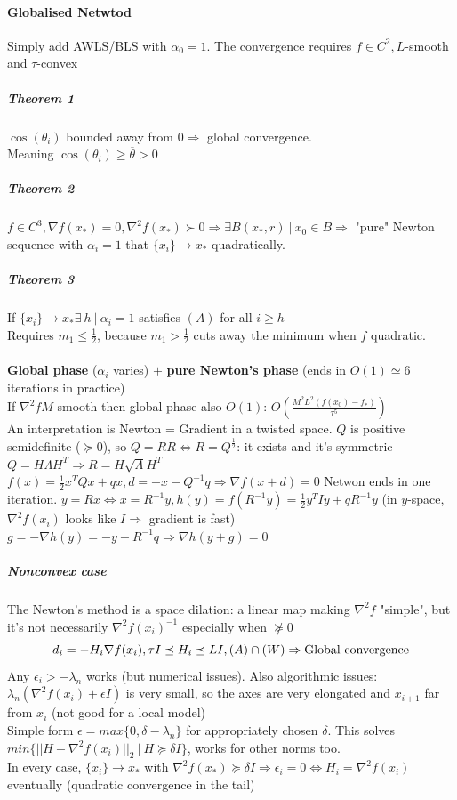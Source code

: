 \documentclass[10pt]{report}
\begin{document}
\paragraph{Globalised Netwtod} Simply add AWLS/BLS with $\alpha_0 = 1$. The convergence requires $f\in C^2, L$-smooth and $\tau$-convex
\subparagraph{Theorem 1} $\cos(\theta_i)$ bounded away from $0 \Rightarrow$ global convergence.\\
Meaning $\cos(\theta_i)\geq \overline{\theta} > 0$
\subparagraph{Theorem 2} $f\in C^3, \nabla f(x_*) = 0, \nabla^2 f(x_*)\succ 0\Rightarrow\exists B(x_*, r)\:|\:x_0\in B\Rightarrow$ "pure" Newton sequence with $\alpha_i = 1$ that $\{x_i\}\rightarrow x_*$ quadratically.
\subparagraph{Theorem 3} If $\{x_i\}\rightarrow x_* \exists\:h\:|\:\alpha_i = 1$ satisfies $(A)$ for all $i\geq h$\\
Requires $m_1\leq \frac{1}{2}$, because $m_1>\frac{1}{2}$ cuts away the minimum when $f$ quadratic.\\\\
\textbf{Global phase} ($\alpha_i$ varies) $+$ \textbf{pure Newton's phase} (ends in $O(1)\simeq 6$ iterations in practice)\\
If $\nabla^2 f M$-smooth then global phase also $O(1)$: $O\left(\frac{M^2L^2(f(x_0)-f_*)}{\tau^5}\right)$\\
An interpretation is Newton = Gradient in a twisted space. $Q$ is positive semidefinite ($\succeq 0$), so $Q= RR\Leftrightarrow R = Q^{\frac{1}{2}}$: it exists and it's symmetric $Q=H\Lambda H^T\Rightarrow R = H\sqrt{\Lambda}H^T$\\
$f(x) = \frac{1}{2}x^TQx + qx, d = -x-Q^{-1}q \Rightarrow \nabla f(x+d)=0$ Netwon ends in one iteration. $y = Rx \Leftrightarrow x = R^{-1}y, h(y) = f(R^{-1}y) = \frac{1}{2}y^TIy + qR^{-1}y$ (in $y$-space, $\nabla^2 f(x_i)$ looks like $I\Rightarrow$ gradient is fast)\\
$g = -\nabla h(y) = -y-R^{-1}q \Rightarrow \nabla h(y+g) = 0$
\subparagraph{Nonconvex case} The Newton's method is a space dilation: a linear map making $\nabla^2 f$ "simple", but it's not necessarily $\nabla^2f(x_i)^{-1}$ especially when $\not\succeq 0$
$$d_i=-H_{i}\nabla f(x_i),\tau I\preceq H_i\preceq LI, (A)\cap (W)\Rightarrow\hbox{Global convergence}$$
Any $\epsilon_i > -\lambda_n$ works (but numerical issues). Also algorithmic issues: $\lambda_n(\nabla^2 f(x_i)+\epsilon I)$ is very small, so the axes are very elongated and $x_{i+1}$ far from $x_i$ (not good for a local model)\\
Simple form $\epsilon = max\{0,\delta - \lambda_n\}$ for appropriately chosen $\delta$. This solves $min\{||H-\nabla^2 f(x_i)||_2\:|\:H\succeq \delta I\}$, works for other norms too.\\
In every case, $\{x_i\}\rightarrow x_*$ with $\nabla^2 f(x_*)\succeq \delta I\Rightarrow \epsilon_i = 0 \Leftrightarrow H_i = \nabla^2 f(x_i)$ eventually (quadratic convergence in the tail)
\end{document}
